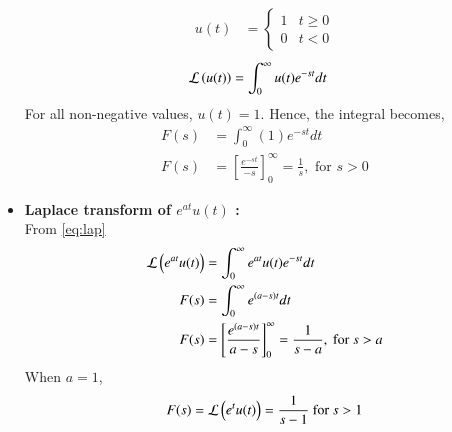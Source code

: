 \documentclass[journal]{IEEEtran}
\begin{document}
\begin{itemize}
		\begin{align}
			u(t) &= 
			\begin{cases} 
			1 & t \geq 0 \\
			0 & t < 0
			\end{cases} \label{eq:ut}
		\end{align}
		\begin{align}
			\mathcal{L} \left(u(t)\right) &= \int_{0}^{\infty} u(t) e^{-st} dt 
		\end{align}
		For all non-negative values, $u(t) = 1$. Hence, the integral becomes,
		\begin{align}
			F(s) &= \int_{0}^{\infty} (1)e^{-st} dt \\
			F(s) &= \left[ \frac{e^{-st}}{-s} \right]_{0}^{\infty} = \frac{1}{s} ,  \text{ for } s > 0 \label{eq:first}
		\end{align}
	\item \textbf{Laplace transform of $e^{at} u(t)$ :} \\
		From \eqref{eq:lap}
		\begin{align}
			\mathcal{L} \left(e^{at} u(t)\right) &= \int_{0}^{\infty} e^{at} u(t) e^{-st} dt \\
			F(s) &= \int_{0}^{\infty} e^{(a-s)t} dt \\
			F(s) &= \left[\frac{e^{(a-s)t}}{a-s} \right]_{0}^{\infty} = \frac{1}{s-a} , \text{ for } s > a
		\end{align}
		When $a=1$, 
		\begin{align}
			F(s) = \mathcal{L} \left(e^t u(t)\right) = \frac{1}{s-1} \label{eq:second} \text{ for } s > 1  
		\end{align}
\end{itemize}
\end{document}
